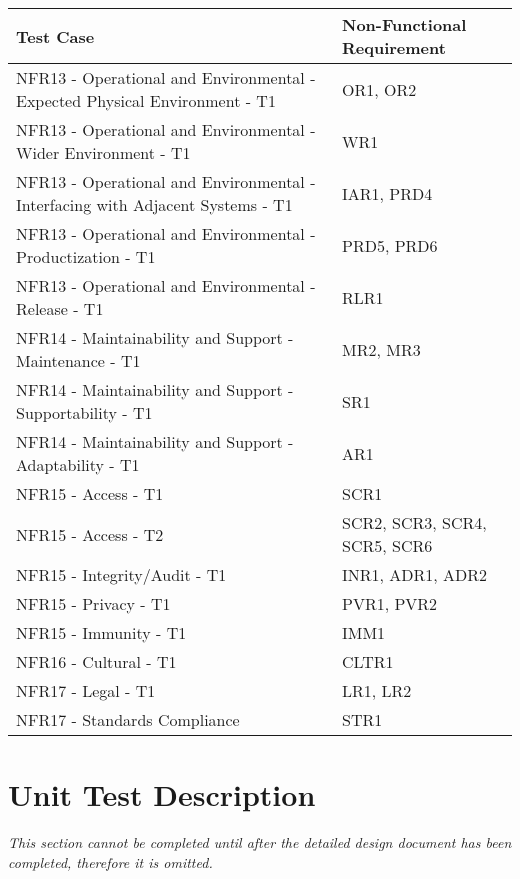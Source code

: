 \documentclass[12pt, titlepage]{article}
\begin{document}
\begin{tabularx}{\textwidth}{p{7cm}p{7cm}}
\toprule {\bf Test Case} & {\bf Non-Functional Requirement}\\
\midrule
{NFR13 - Operational and Environmental - Expected Physical Environment - T1} & {OR1, OR2} \\
{NFR13 - Operational and Environmental - Wider Environment - T1} & {WR1} \\
{NFR13 - Operational and Environmental - Interfacing with Adjacent Systems - T1 } & {IAR1, PRD4} \\
{NFR13 - Operational and Environmental - Productization - T1} & {PRD5, PRD6} \\
{NFR13 - Operational and Environmental - Release - T1} & {RLR1} \\
{NFR14 - Maintainability and Support - Maintenance - T1} & {MR2, MR3} \\
{NFR14 - Maintainability and Support - Supportability - T1} & {SR1} \\
{NFR14 - Maintainability and Support - Adaptability - T1} & {AR1} \\
{NFR15 - Access - T1} & {SCR1} \\
{NFR15 - Access - T2} & {SCR2, SCR3, SCR4, SCR5, SCR6} \\
{NFR15 - Integrity/Audit - T1} & {INR1, ADR1, ADR2} \\
{NFR15 - Privacy - T1} & {PVR1, PVR2} \\
{NFR15 - Immunity - T1} & {IMM1} \\
{NFR16 - Cultural - T1} & {CLTR1} \\
{NFR17 - Legal - T1} & {LR1, LR2} \\
{NFR17 - Standards Compliance} & {STR1}\\
\bottomrule
\end{tabularx}

\newpage
\section{Unit Test Description}


\textit{This section cannot be completed until after the detailed design document has been completed, therefore it is omitted.}

\end{document}

